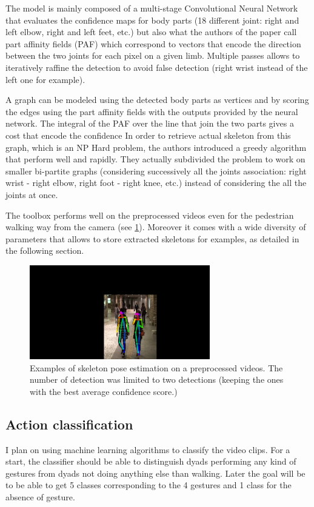 \documentclass[12pt,a4paper,twoside]{article}
\begin{document}
The model is mainly composed of a multi-stage Convolutional Neural Network that evaluates the confidence maps for body parts (18 different joint: right and left elbow, right and left feet, etc.) but also what the authors of the paper call \guillemotleft part affinity fields \guillemotright (PAF) which correspond to vectors that encode the direction between the two joints for each pixel on a given limb. Multiple passes allows to iteratively raffine the detection to avoid false detection (right wrist instead of the left one for example). 

A graph can be modeled using the detected body parts as vertices and by scoring the edges using the part affinity fields with the outputs provided by the neural network. The integral of the PAF over the line that join the two parts gives a cost that encode the confidence In order to retrieve actual skeleton from this graph, which is an NP Hard problem, the authors  introduced a greedy algorithm that perform well and rapidly. They actually subdivided the problem to work on smaller bi-partite graphs (considering successively all the joints association: right wrist - right elbow, right foot - right knee, etc.) instead of considering the all the joints at once.

The toolbox performs well on the preprocessed videos even for the pedestrian walking way from the camera (see \ref{fig:skeleton}). Moreover it comes with a wide diversity of parameters that allows to store extracted skeletons for examples, as detailed in the following section.

\begin{figure}
    \centering
        \includegraphics[width=0.7\textwidth]{images/dyad_rendered}
    \caption{Examples of skeleton pose estimation on a preprocessed videos. The number of detection was limited to two detections (keeping the ones with the best average confidence score.)}
    \label{fig:skeleton}
\end{figure}

\subsection{Action classification}
I plan on using machine learning algorithms to classify the video clips. For a start, the classifier should be able to distinguish dyads performing any kind of gestures from dyads not doing anything else than walking. Later the goal will be to be able to get 5 classes corresponding to the 4 gestures and 1 class for the absence of gesture.
\end{document}
